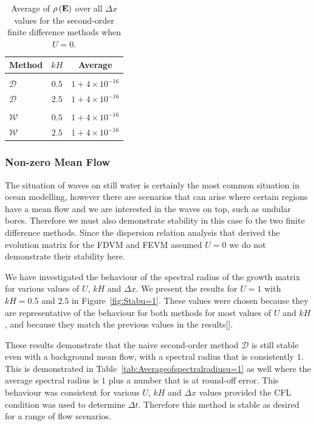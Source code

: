 \begin{table}
	\centering
	\begin{tabular}{l  c  c}
		Method & $kH$& Average\\
		\hline && \\
		$\mathcal{D}$& $0.5$ & $1+ 4\times 10^{-16}$  \\
		$\mathcal{D}$& $2.5$ & $1+ 4\times 10^{-16}$  \\
		\hline \\
		$\mathcal{W}$& $0.5$ & $1+ 4\times 10^{-16}$  \\
		$\mathcal{W}$& $2.5$ & $1+ 4\times 10^{-16}$ 
	\end{tabular}
	\caption{Average of $\rho\left(\mathbf{E}\right)$ over all $\Delta x$ values for the second-order finite difference methods when $U=0$.}
	\label{tab:Averageofspectralradiusu=0}
\end{table}


\subsubsection{Non-zero Mean Flow} 
The situation of waves on still water is certainly the most common situation in ocean modelling, however there are scenarios that can arise where certain regions have a mean flow and we are interested in the waves on top, such as undular bores. Therefore we must also demonstrate stability in this case fo the two finite difference methods. Since the dispersion relation analysis that derived the evolution matrix for the FDVM and FEVM assumed $U=0$ we do not demonstrate their stability here. 

We have investigated the behaviour of the spectral radius of the growth matrix for various values of $U$, $kH$ and $\Delta x$. We present the results for $U =1$ with $kH =0.5$ and $2.5$ in Figure~\ref{fig:Stabu=1}. These values were chosen because they are representative of the behaviour for both methods for most values of $U$ and $kH$, and because they match the previous values in the results[]. 

These results demonstrate that the naive second-order method $\mathcal{D}$ is still stable even with a background mean flow, with a spectral radius that is consistently $1$. This is demonstrated in Table~\ref{tab:Averageofspectralradiusu=1} as well where the average spectral radius is $1$ plus a number that is at round-off error. This behaviour was consistent for various $U$, $kH$ and $\Delta x$ values provided the CFL condition was used to determine $\Delta t$. Therefore this method is stable as desired for a range of flow scenarios. 

